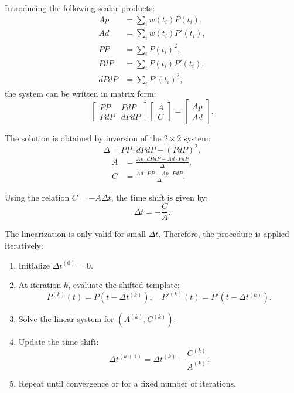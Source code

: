 \documentclass{article}
\begin{document}
Introducing the following scalar products:
\begin{align}
Ap   &= \sum_i w(t_i) P(t_i), \\
Ad   &= \sum_i w(t_i) P'(t_i), \\
PP   &= \sum_i P(t_i)^2, \\
PdP  &= \sum_i P(t_i) P'(t_i), \\
dPdP &= \sum_i P'(t_i)^2,
\end{align}
the system can be written in matrix form:
\begin{equation}
\begin{bmatrix}
PP & PdP \\
PdP & dPdP
\end{bmatrix}
\begin{bmatrix}
A \\
C
\end{bmatrix}
=
\begin{bmatrix}
Ap \\
Ad
\end{bmatrix}.
\end{equation}


The solution is obtained by inversion of the $2 \times 2$ system:
\begin{equation}
\Delta = PP \cdot dPdP - (PdP)^2,
\end{equation}
\begin{align}
A &= \frac{Ap \cdot dPdP - Ad \cdot PdP}{\Delta}, \\
C &= \frac{Ad \cdot PP - Ap \cdot PdP}{\Delta}.
\end{align}


Using the relation $C = -A \Delta t$, the time shift is given by:
\begin{equation}
\Delta t = -\frac{C}{A}.
\end{equation}



The linearization is only valid for small $\Delta t$. Therefore, the procedure is applied iteratively:

\begin{enumerate}
    \item Initialize $\Delta t^{(0)} = 0$.
    \item At iteration $k$, evaluate the shifted template:
    \begin{equation}
    P^{(k)}(t) = P(t - \Delta t^{(k)}), \quad
    P'^{(k)}(t) = P'(t - \Delta t^{(k)}).
    \end{equation}
    \item Solve the linear system for $(A^{(k)}, C^{(k)})$.
    \item Update the time shift:
    \begin{equation}
    \Delta t^{(k+1)} = \Delta t^{(k)} - \frac{C^{(k)}}{A^{(k)}}.
    \end{equation}
    \item Repeat until convergence or for a fixed number of iterations.
\end{enumerate}
\end{document}

